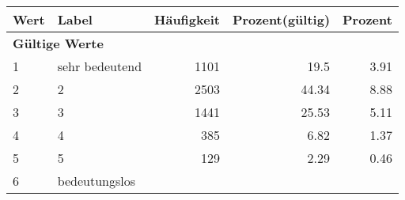      \begin{longtable}{lXrrr}
     \toprule
     \textbf{Wert} & \textbf{Label} & \textbf{Häufigkeit} & \textbf{Prozent(gültig)} & \textbf{Prozent} \\
     \endhead
     \midrule
     \multicolumn{5}{l}{\textbf{Gültige Werte}}\\

     1 &
     \multicolumn{1}{X}{ sehr bedeutend   } &


       \num{1101} &
       \num[round-mode=places,round-precision=2]{19,5} &
         \num[round-mode=places,round-precision=2]{3,91} \\

     2 &
     \multicolumn{1}{X}{ 2   } &


       \num{2503} &
       \num[round-mode=places,round-precision=2]{44,34} &
         \num[round-mode=places,round-precision=2]{8,88} \\

     3 &
     \multicolumn{1}{X}{ 3   } &


       \num{1441} &
       \num[round-mode=places,round-precision=2]{25,53} &
         \num[round-mode=places,round-precision=2]{5,11} \\

     4 &
     \multicolumn{1}{X}{ 4   } &


       \num{385} &
       \num[round-mode=places,round-precision=2]{6,82} &
         \num[round-mode=places,round-precision=2]{1,37} \\

     5 &
     \multicolumn{1}{X}{ 5   } &


       \num{129} &
       \num[round-mode=places,round-precision=2]{2,29} &
         \num[round-mode=places,round-precision=2]{0,46} \\

     6 &
     \multicolumn{1}{X}{ bedeutungslos   } &



\end{longtable}
